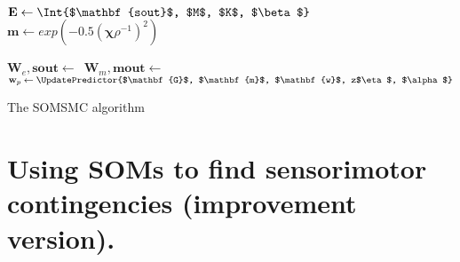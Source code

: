 \documentclass[a4paper]{article}
\begin{document}
\begin{algorithm}[H]
{{    	\BlankLine
	
        $\mathbf{E}\leftarrow\Int{$\mathbf{sout}$, $M$, $K$, $\beta$}$\;
		$\mathbf{m} \leftarrow exp(-0.5(\boldsymbol{\chi}\rho^{-1})^2)$\;
        
        \BlankLine
        
        $\mathbf{W}_e,\mathbf{sout}\leftarrow$\,\;
        $\mathbf{W}_m,\mathbf{mout}\leftarrow$\,\;
        $\mathbf{w}_p\leftarrow\UpdatePredictor{$\mathbf{G}$, $\mathbf{m}$, $\mathbf{w}$, z$\eta$, $\alpha$}$\;

    	\BlankLine
	
    }
}

\caption{The SOMSMC algorithm}\label{smc1}
\end{algorithm}
\DecMargin{1em}

\pagebreak
\section*{Using SOMs to find sensorimotor contingencies (improvement version).}
\end{document}
